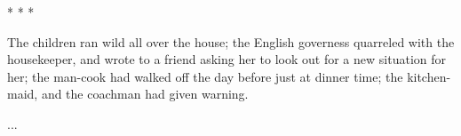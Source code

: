 \documentclass[12pt,paper=letter]{scrartcl}
\newcommand{\divider}{\vspace{0.5\baselineskip} \centerline{* * *} \vspace{0.5\baselineskip}}
\begin{document}
\divider

The children ran wild all over the house; the English governess quarreled with the housekeeper, and wrote to a friend asking her to look out for a new situation for her; the man-cook had walked off the day before just at dinner time; the kitchen-maid, and the coachman had given warning.

\begin{exe}
    \ex ...
\end{exe}


\printbibliography
\end{document}
